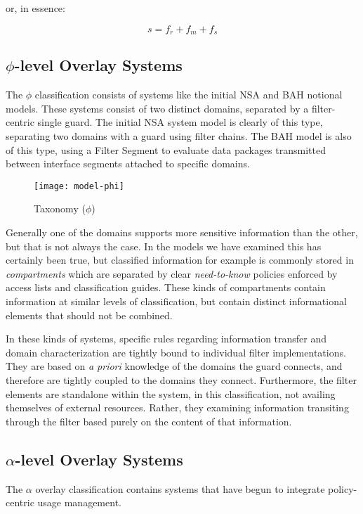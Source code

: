 or, in essence:

\begin{equation}
s = f_{r} + f_{m} + f_{s}
\end{equation}

\subsection{$\phi$-level Overlay Systems}
The $\phi$ classification consists of systems like the initial NSA and BAH notional models.  These systems consist of two distinct domains, separated by a filter-centric single guard.  The initial NSA system model is clearly of this type, separating two domains with a guard using filter chains.  The BAH model is also of this type, using a Filter Segment to evaluate data packages transmitted between interface segments attached to specific domains.

\begin{figure}[!t]
\centering
\texttt{[image: model-phi]}
\caption{Taxonomy ($\phi$)}
\label{fig:model:taxonomy-phi}
\end{figure}

Generally one of the domains supports more sensitive information than the other, but that is not always the case.  In the models we have examined this has certainly been true, but classified information for example  is commonly stored in \textit{compartments} which are separated by clear \textit{need-to-know} policies enforced by access lists and classification guides.  These kinds of compartments contain information at similar levels of classification, but contain distinct informational elements that should not be combined.

In these kinds of systems, specific rules regarding information transfer and domain characterization are tightly bound to individual filter implementations.  They are based on \textit{a priori} knowledge of the domains the guard connects, and therefore are tightly coupled to the domains they connect.  Furthermore, the filter elements are standalone within the system, in this classification, not availing themselves of external resources.  Rather, they examining information transiting through the filter based purely on the content of that information.

\subsection{$\alpha$-level Overlay Systems}
The $\alpha$ overlay classification contains systems that have begun to integrate policy-centric usage management.

